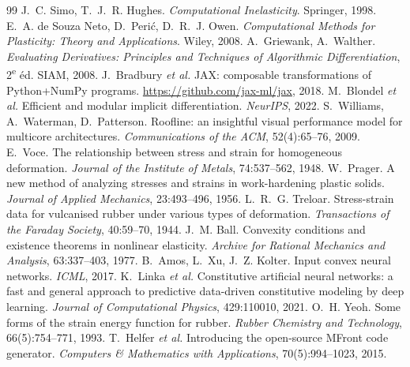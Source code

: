 \begin{thebibliography}{99}\small
{} J.~C. Simo, T.~J.~R. Hughes. \emph{Computational Inelasticity}. Springer, 1998.
 E.~A. de Souza Neto, D.~Perić, D.~R.~J. Owen. \emph{Computational Methods for Plasticity: Theory and Applications}. Wiley, 2008.
 A.~Griewank, A.~Walther. \emph{Evaluating Derivatives: Principles and Techniques of Algorithmic Differentiation}, 2\textsuperscript{e} éd. SIAM, 2008.
 J.~Bradbury \emph{et al.} JAX: composable transformations of Python+NumPy programs. \url{https://github.com/jax-ml/jax}, 2018.
 M.~Blondel \emph{et al.} Efficient and modular implicit differentiation. \emph{NeurIPS}, 2022.
 S.~Williams, A.~Waterman, D.~Patterson. Roofline: an insightful visual performance model for multicore architectures. \emph{Communications of the ACM}, 52(4):65--76, 2009.
 E.~Voce. The relationship between stress and strain for homogeneous deformation. \emph{Journal of the Institute of Metals}, 74:537--562, 1948.
 W.~Prager. A new method of analyzing stresses and strains in work-hardening plastic solids. \emph{Journal of Applied Mechanics}, 23:493--496, 1956.
 L.~R.~G. Treloar. Stress-strain data for vulcanised rubber under various types of deformation. \emph{Transactions of the Faraday Society}, 40:59--70, 1944.
 J.~M. Ball. Convexity conditions and existence theorems in nonlinear elasticity. \emph{Archive for Rational Mechanics and Analysis}, 63:337--403, 1977.
 B.~Amos, L.~Xu, J.~Z. Kolter. Input convex neural networks. \emph{ICML}, 2017.
 K.~Linka \emph{et al.} Constitutive artificial neural networks: a fast and general approach to predictive data-driven constitutive modeling by deep learning. \emph{Journal of Computational Physics}, 429:110010, 2021.
 O.~H. Yeoh. Some forms of the strain energy function for rubber. \emph{Rubber Chemistry and Technology}, 66(5):754--771, 1993.
 T.~Helfer \emph{et al.} Introducing the open-source MFront code generator. \emph{Computers \& Mathematics with Applications}, 70(5):994--1023, 2015.
\end{thebibliography}
